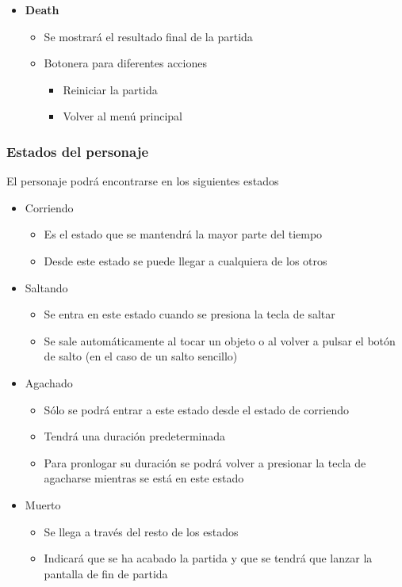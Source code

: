 \documentclass[palatino]{apuntes}
\begin{document}
\begin{itemize}
    \item \textbf{Death}
        \begin{itemize}
            \item Se mostrará el resultado final de la partida
            \item Botonera para diferentes acciones
                \begin{itemize}
                    \item Reiniciar la partida
                    \item Volver al menú principal
                \end{itemize}
        \end{itemize}
\end{itemize}


\subsubsection{Estados del personaje}
El personaje podrá encontrarse en los siguientes estados

\begin{itemize}
    \item Corriendo
    \begin{itemize}
        \item Es el estado que se mantendrá la mayor parte del tiempo
        \item Desde este estado se puede llegar a cualquiera de los otros
    \end{itemize}
    \item Saltando
    \begin{itemize}
        \item Se entra en este estado cuando se presiona la tecla de saltar
        \item Se sale automáticamente al tocar un objeto o al volver a pulsar el botón de salto (en el caso de un salto sencillo)
    \end{itemize}
    \item Agachado
    \begin{itemize}
        \item Sólo se podrá entrar a este estado desde el estado de corriendo
        \item Tendrá una duración predeterminada
        \item Para pronlogar su duración se podrá volver a presionar la tecla de agacharse mientras se está en este estado
    \end{itemize}
    \item Muerto
    \begin{itemize}
        \item Se llega a través del resto de los estados
        \item Indicará que se ha acabado la partida y que se tendrá que lanzar la pantalla de fin de partida
    \end{itemize}
\end{itemize}
\end{document}
